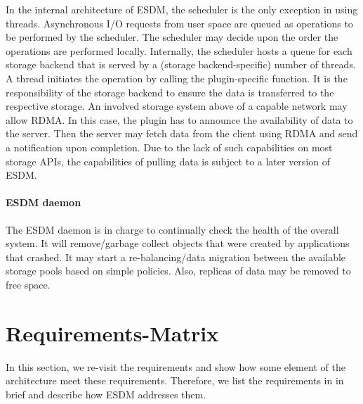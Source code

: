In the internal architecture of ESDM, the scheduler is the only exception in using threads.
Asynchronous I/O requests from user space are queued as operations to be performed by the scheduler.
The scheduler may decide upon the order the operations are performed locally.
Internally, the scheduler hosts a queue for each storage backend that is served by a (storage backend-specific) number of threads.
A thread initiates the operation by calling the plugin-specific function.
It is the responsibility of the storage backend to ensure the data is transferred to the respective storage.
An involved storage system above of a capable network may allow RDMA.
In this case, the plugin has to announce the availability of data to the server. Then the server may fetch data from the client using RDMA and send a notification upon completion.
Due to the lack of such capabilities on most storage APIs, the capabilities of pulling data is subject to a later version of ESDM.


\paragraph{ESDM daemon}

The ESDM daemon is in charge to continually check the health of the overall system.
It will remove/garbage collect objects that were created by applications that crashed.
It may start a re-balancing/data migration between the available storage pools based on simple policies.
Also, replicas of data may be removed to free space.





\section{Requirements-Matrix}
\label{seq:req matrix}
In this section, we re-visit the requirements and show how some element of the architecture meet these requirements.
Therefore, we list the requirements in  in brief and describe how ESDM addresses them.


